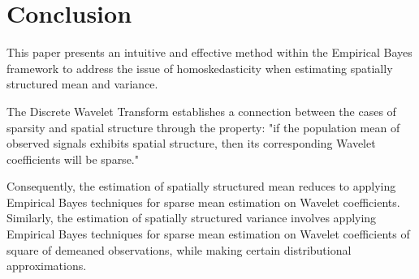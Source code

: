 \documentclass[11pt]{article}
\begin{document}
\section{Conclusion}
This paper presents an intuitive and effective method within the Empirical Bayes framework to address the issue of homoskedasticity when estimating spatially structured mean and variance. 

The Discrete Wavelet Transform establishes a connection between the cases of sparsity and spatial structure through the property: "if the population mean of observed signals exhibits spatial structure, then its corresponding Wavelet coefficients will be sparse."

Consequently, the estimation of spatially structured mean reduces to applying Empirical Bayes techniques for sparse mean estimation on Wavelet coefficients. Similarly, the estimation of spatially structured variance involves applying Empirical Bayes techniques for sparse mean estimation on Wavelet coefficients of square of demeaned observations, while making certain distributional approximations.




\end{document}
